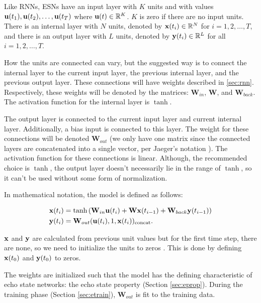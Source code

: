 \documentclass{article}
\begin{document}
Like RNNs, ESNs have an input layer with $K$ units and with values 
$\mathbf{u}(t_1), \mathbf{u}(t_2), \dots,  \mathbf{u}(t_T)$ where $\mathbf{u}(t) \in \mathbb{R}^K$.
$K$ is zero if there are no input units. There is an internal layer
with $N$ units, denoted by $\mathbf{x}(t_i) \in \mathbb{R}^N$ for
$i = 1, 2, \dots, T$, and 
there is an output 
layer with $L$ units, denoted by $\mathbf{y}(t_i) \in \mathbb{R}^L$ for all
$i = 1, 2, \dots, T$.

\newcommand{\W}{\mathbf{W}}
\newcommand{\Win}{\mathbf{W}_{in}}
\newcommand{\Wback}{\mathbf{W}_{back}}
\newcommand{\Wout}{\mathbf{W}_{out}}

How the units are connected can vary, but the suggested way 
\cite{jaeger2002tutorial} is to connect the internal layer to the current 
input layer, the previous internal layer, and the previous output layer. 
These connections will have weights described in \ref{sec:rnn}. 
Respectively, these weights will be denoted by the matrices:
$\Win$, $\W$, and $\Wback$. The activation function for the internal
layer is $\tanh$.

The output layer is connected to the current input layer and current 
internal layer. Additionally, a bias input is connected to this layer.
The weight for these connections will be denoted $\Wout$ 
(we only have one matrix since the connected layers are concatenated into a
single vector, per Jaeger's notation \cite{jaeger2002tutorial}). The 
activation function for these connections is linear. Although, the 
recommended choice
is $\tanh$, the output layer doesn't necessarily lie in the range of 
$\tanh$, so it can't be used without some form of normalization.

In mathematical notation, the model is defined as follows:

\begin{align}
    \xv(t_{i}) &= \tanh \left(
            \Win \uv(t_i)
            + \W \xv(t_{i-1})
            + \Wback \yv(t_{i-1})
        \right) \\
    \yv(t_i) &= \Wout (\uv(t_i), 1, \xv(t_i))_{\text{concat}}.
\end{align}

$\mathbf{x}$ and $\mathbf{y}$ are calculated from previous unit values but for the 
first time step, there are none, so we need to initialize the
units to zeros \cite{jaeger2002tutorial}. 
This is done by defining $\mathbf{x}(t_0)$ and $\mathbf{y}(t_0)$ to zeros.

The weights are initialized such that the model has the defining 
characteristic of echo state networks: the echo state property
(Section \ref{sec:eprop}).
During the training phase (Section \ref{sec:etrain}), $\Wout$ is fit to
the training data. 
\end{document}
